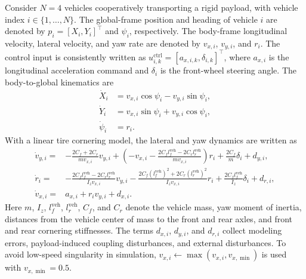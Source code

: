 \documentclass[twocolumn,3p,times,procedia]{elsarticle}
\begin{document}
Consider $N=4$ vehicles cooperatively transporting a rigid payload, with vehicle index $i\in\{1,\ldots,N\}$. The global-frame position and heading of vehicle $i$ are denoted by
$p_i=[X_i,Y_i]^\top$ and $\psi_i$, respectively. The body-frame longitudinal velocity, lateral velocity, and yaw rate are denoted by $v_{x,i}$, $v_{y,i}$, and $r_i$. The control input is consistently written as $u_{i,k}^{\mathrm{ctrl}}=[a_{x,i,k},\delta_{i,k}]^\top$, where $a_{x,i}$ is the longitudinal acceleration command and $\delta_i$ is the front-wheel steering angle. The body-to-global kinematics are
\begin{equation}
\begin{aligned}
\dot X_i &= v_{x,i}\cos\psi_i-v_{y,i}\sin\psi_i,\\
\dot Y_i &= v_{x,i}\sin\psi_i+v_{y,i}\cos\psi_i,\\
\dot \psi_i &= r_i .
\end{aligned}
\label{eq:world_kinematics}
\end{equation}
With a linear tire cornering model, the lateral and yaw dynamics are written as
\begin{equation}
\begin{aligned}
\dot v_{y,i}=&-\frac{2C_f+2C_r}{m v_{x,i}}v_{y,i}+
\left(-v_{x,i}-\frac{2C_f l_f^{\mathrm{veh}}-2C_r l_r^{\mathrm{veh}}}{m v_{x,i}}\right)r_i
+\frac{2C_f}{m}\delta_i+d_{y,i},\\
\dot r_i=&-\frac{2C_f l_f^{\mathrm{veh}}-2C_r l_r^{\mathrm{veh}}}{I_z v_{x,i}}v_{y,i}
-\frac{2C_f (l_f^{\mathrm{veh}})^2+2C_r (l_r^{\mathrm{veh}})^2}{I_z v_{x,i}}r_i
+\frac{2C_f l_f^{\mathrm{veh}}}{I_z}\delta_i+d_{r,i},\\
\dot v_{x,i}=&a_{x,i}+r_i v_{y,i}+d_{x,i}.
\end{aligned}
\label{eq:bicycle_dynamics}
\end{equation}
Here $m$, $I_z$, $l_f^{\mathrm{veh}}$, $l_r^{\mathrm{veh}}$, $C_f$, and $C_r$ denote the vehicle mass, yaw moment of inertia, distances from the vehicle center of mass to the front and rear axles, and front and rear cornering stiffnesses. The terms $d_{x,i}$, $d_{y,i}$, and $d_{r,i}$ collect modeling errors, payload-induced coupling disturbances, and external disturbances. To avoid low-speed singularity in simulation, $v_{x,i}\leftarrow\max(v_{x,i},v_{x,\min})$ is used with $v_{x,\min}=0.5$.
\end{document}
